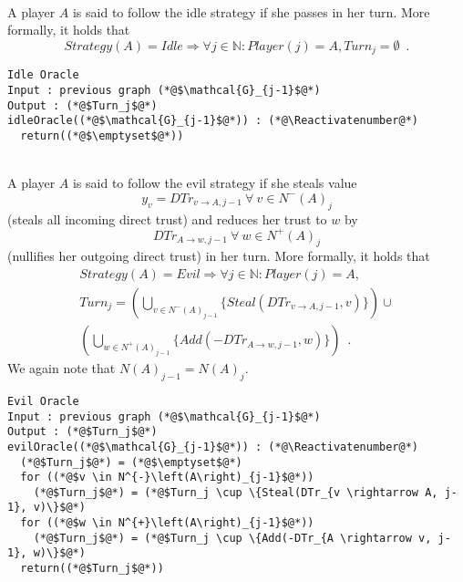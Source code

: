 \documentclass[11pt]{llncs}
\makeatletter
\newcommand*\Suppressnumber{%
  \lst@AddToHook{OnNewLine}{%
    \let\thelstnumber\relax%
     \advance\c@lstnumber-\@ne\relax%
    }%
}
\makeatother
\begin{document}
     \begin{definition} \ \\
        A player $A$ is said to follow the idle strategy if she passes in her turn. More formally, it holds that
        \begin{equation}
           Strategy\left(A\right) = Idle \Rightarrow \forall j \in \mathbb{N} : Player\left(j\right) = A, Turn_j = \emptyset
           \enspace.
        \end{equation}
     \end{definition}
     \Suppressnumber
     \begin{lstlisting}[label=idleoracle, style=numbers]
Idle Oracle
Input : previous graph (*@$\mathcal{G}_{j-1}$@*)
Output : (*@$Turn_j$@*)
idleOracle((*@$\mathcal{G}_{j-1}$@*)) : (*@\Reactivatenumber@*)
  return((*@$\emptyset$@*))
     \end{lstlisting}
     \begin{definition} \ \\
        A player $A$ is said to follow the evil strategy if she steals value
        \begin{equation}
           y_v = DTr_{v \rightarrow A, j-1} \: \forall \: v \in N^{-}\left(A\right)_j
        \end{equation}
        (steals all incoming direct trust) and reduces her trust to $w$ by
        \begin{equation}
           DTr_{A \rightarrow w, j-1} \: \forall \: w \in N^{+}\left(A\right)_j
        \end{equation}
        (nullifies her outgoing direct trust) in her turn.
        More formally, it holds that
        \begin{equation}
        \begin{gathered}
           Strategy\left(A\right) = Evil \Rightarrow \forall j \in \mathbb{N} : Player\left(j\right) = A, \\
           Turn_j = \left(\bigcup\limits_{v \in N^{-}\left(A\right)_{j-1}}\{Steal(DTr_{v \rightarrow A, j-1}, v)\}\right)
           \cup \\ \left(\bigcup\limits_{w \in N^{+}\left(A\right)_{j-1}}\{Add\left(-DTr_{A \rightarrow w, j-1},
           w\right)\}\right) \enspace.
        \end{gathered}
        \end{equation}
        We again note that $N(A)_{j-1} = N(A)_j$.
     \end{definition}
     \Suppressnumber
     \begin{lstlisting}[label=eviloracle, style=numbers]
Evil Oracle
Input : previous graph (*@$\mathcal{G}_{j-1}$@*)
Output : (*@$Turn_j$@*)
evilOracle((*@$\mathcal{G}_{j-1}$@*)) : (*@\Reactivatenumber@*)
  (*@$Turn_j$@*) = (*@$\emptyset$@*)
  for ((*@$v \in N^{-}\left(A\right)_{j-1}$@*))
    (*@$Turn_j$@*) = (*@$Turn_j \cup \{Steal(DTr_{v \rightarrow A, j-1}, v)\}$@*)
  for ((*@$w \in N^{+}\left(A\right)_{j-1}$@*))
    (*@$Turn_j$@*) = (*@$Turn_j \cup \{Add(-DTr_{A \rightarrow v, j-1}, w)\}$@*)
  return((*@$Turn_j$@*))
     \end{lstlisting}
\end{document}
